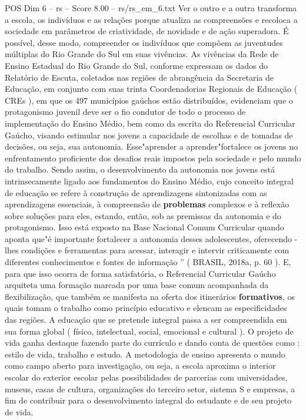 \begin{textsample}{POS Dim 6 – rs – Score 8.00 – rs/rs\_em\_6.txt}
Ver o outro e a outra transforma a escola, os indivíduos e as relações porque atualiza as compreensões e recoloca a sociedade em parâmetros de criatividade, de novidade e de ação superadora.
É possível, desse modo, compreender os indivíduos que compõem as juventudes múltiplas do Rio Grande do Sul em suas vivências.
As vivências da Rede de Ensino Estadual do Rio Grande do Sul, conforme expressam os dados do Relatório de Escuta, coletados nas regiões de abrangência da Secretaria de Educação, em conjunto com suas trinta Coordenadorias Regionais de Educação ( CREs ), em que os 497 municípios gaúchos estão distribuídos, evidenciam que o protagonismo juvenil deve ser o fio condutor de todo o processo de implementação do Ensino Médio, bem como da escrita do Referencial Curricular Gaúcho, visando estimular nos jovens a capacidade de escolhas e de tomadas de decisões, ou seja, sua autonomia.
Esse"aprender a aprender"fortalece os jovens no enfrentamento proficiente dos desafios reais impostos pela sociedade e pelo mundo do trabalho.
Sendo assim, o desenvolvimento da autonomia nos jovens está intrinsecamente ligado aos fundamentos do Ensino Médio, cujo conceito integral de educação se refere à construção de aprendizagens sintonizadas com as aprendizagens essenciais, à compreensão de \textbf{problemas} complexos e à reflexão sobre soluções para eles, estando, então, sob as premissas da autonomia e do protagonismo.
Isso está exposto na Base Nacional Comum Curricular quando aponta que"é importante fortalecer a autonomia desses adolescentes, oferecendo -lhes condições e ferramentas para acessar, interagir e intervir criticamente com diferentes conhecimentos e fontes de informação ” ( BRASIL, 2018a, p. 60 ).
E, para que isso ocorra de forma satisfatória, o Referencial Curricular Gaúcho arquiteta uma formação marcada por uma base comum acompanhada da flexibilização, que também se manifesta na oferta dos itinerários \textbf{formativos}, os quais tomam o trabalho como princípio educativo e elencam as especificidades das regiões.
A educação que se pretende integral passa a ser compreendida em sua forma global ( físico, intelectual, social, emocional e cultural ).
O projeto de vida ganha destaque fazendo parte do currículo e dando conta de questões como : estilo de vida, trabalho e estudo.
A metodologia de ensino apresenta o mundo como campo aberto para investigação, ou seja, a escola aproxima o interior escolar do exterior escolar pelas possibilidades de parcerias com universidades, museus, casas de cultura, organizações do terceiro setor, sistema S e empresas, a fim de contribuir para o desenvolvimento integral do estudante e de seu projeto de vida.

\end{textsample}
